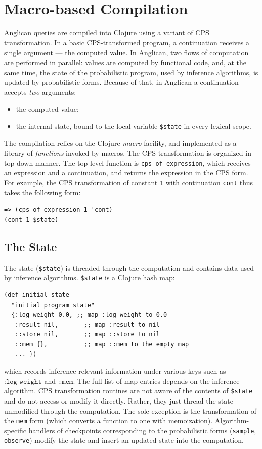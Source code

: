 \documentclass[preprint]{sigplanconf}
\begin{document}
\section{Macro-based Compilation}
\label{sec:compilation}

Anglican queries are compiled into Clojure using a variant of CPS
transformation. In a basic CPS-transformed program, a
continuation receives a single argument --- the computed value.
In Anglican, two flows of computation are performed in
parallel: values are computed by functional code, and,
at the same time, the state of the probabilistic program,
used by inference algorithms, is updated by
probabilistic forms. Because of that, in Anglican a continuation
accepts  \textit{two} arguments:
\begin{itemize}
    \item the computed value;
    \item the internal state, bound to the local variable
        \texttt{\$state} in every lexical scope.
\end{itemize}

The compilation relies on the Clojure \textit{macro} facility,
and implemented as a library of
\textit{functions}\iftoggle{full}{ in namespace
\texttt{anglican.trap}, which are}{} invoked by macros.  The CPS
transformation is organized in top-down manner.  The top-level
function is  \texttt{cps-of-expression}, which receives an
expression and a continuation, and returns the expression in the
CPS form. For example, the CPS transformation of constant
\texttt{1} with continuation \texttt{cont} thus takes the
following form:
\begin{lstlisting}[style=default]
=> (cps-of-expression 1 'cont)
(cont 1 $state)
\end{lstlisting}

\subsection {The State}
\label{sec:state}

The state (\texttt{\$state}) is threaded through the computation
and contains data used by inference algorithms. \texttt{\$state}
is a Clojure hash map:
\begin{lstlisting}[style=default]
(def initial-state
  "initial program state"
  {:log-weight 0.0, ;; map :log-weight to 0.0
   :result nil,       ;; map :result to nil
   ::store nil,       ;; map ::store to nil
   ::mem {},          ;; map ::mem to the empty map 
   ... })
\end{lstlisting}
which records inference-relevant information under various keys such
as $\texttt{:log-weight}$ and $\texttt{::mem}$. The full list of map
entries depends on the inference algorithm. CPS transformation
routines are not aware of the contents of \texttt{\$state} and do not
access or modify it directly. Rather, they just thread the state
unmodified through the computation. The sole exception is the
transformation of  the \texttt{mem} form (which converts a function
to one with memoization). Algorithm-specific handlers of checkpoints
corresponding to the probabilistic forms (\texttt{sample},
\texttt{observe}) modify the state and insert an updated state into
the computation.
\end{document}
